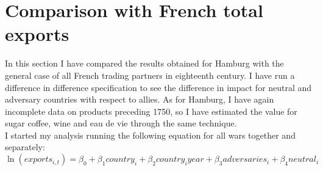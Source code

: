 \documentclass[12pt,a4paper,titlepage]{article}
\begin{document}
\section{Comparison with French total exports}
In this section I have compared the results obtained for Hamburg with the general case of all French trading partners in eighteenth century. I have run a difference in difference specification to see the difference in impact for neutral and adversary countries with respect to allies. As for Hamburg, I have again incomplete data on products preceding 1750, so I have estimated the value for sugar coffee, wine and eau de vie through the same technique. \\
I started my analysis running the following equation for all wars together and separately:
\begin{equation}
\ln(exports_{i,t})=\beta_0+\beta_1country_i+\beta_2country_iyear+\beta_3adversaries_i+\beta_4neutral_i
\end{equation}
\end{document}
